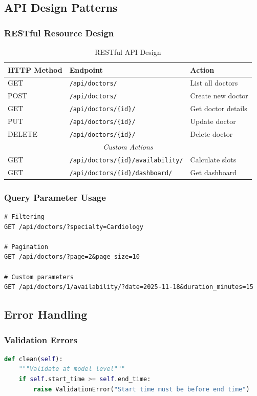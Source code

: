 \documentclass[12pt,a4paper]{article}
\begin{document}
\subsection{API Design Patterns}

\subsubsection{RESTful Resource Design}
\begin{table}[h]
\centering
\begin{tabular}{@{}llp{5cm}@{}}
\toprule
\textbf{HTTP Method} & \textbf{Endpoint} & \textbf{Action} \\
\midrule
GET & \texttt{/api/doctors/} & List all doctors \\
POST & \texttt{/api/doctors/} & Create new doctor \\
GET & \texttt{/api/doctors/\{id\}/} & Get doctor details \\
PUT & \texttt{/api/doctors/\{id\}/} & Update doctor \\
DELETE & \texttt{/api/doctors/\{id\}/} & Delete doctor \\
\midrule
\multicolumn{3}{c}{\textit{Custom Actions}} \\
\midrule
GET & \texttt{/api/doctors/\{id\}/availability/} & Calculate slots \\
GET & \texttt{/api/doctors/\{id\}/dashboard/} & Get dashboard \\
\bottomrule
\end{tabular}
\caption{RESTful API Design}
\end{table}

\subsubsection{Query Parameter Usage}
\begin{lstlisting}[caption={Query Parameters for Filtering and Options}]
# Filtering
GET /api/doctors/?specialty=Cardiology

# Pagination
GET /api/doctors/?page=2&page_size=10

# Custom parameters
GET /api/doctors/1/availability/?date=2025-11-18&duration_minutes=15
\end{lstlisting}

\subsection{Error Handling}

\subsubsection{Validation Errors}
\begin{lstlisting}[language=Python,caption={Model-Level Validation}]
def clean(self):
    """Validate at model level"""
    if self.start_time >= self.end_time:
        raise ValidationError("Start time must be before end time")
\end{lstlisting}
\end{document}
